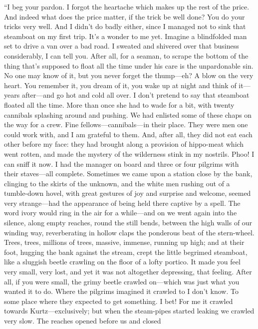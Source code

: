 \documentclass[12pt]{report}
\begin{document}
``I beg your pardon. I forgot the heartache which makes up the rest of
the price. And indeed what does the price matter, if the trick be well
done? You do your tricks very well. And I didn't do badly either, since
I managed not to sink that steamboat on my first trip. It's a wonder to
me yet. Imagine a blindfolded man set to drive a van over a bad road. I
sweated and shivered over that business considerably, I can tell you.
After all, for a seaman, to scrape the bottom of the thing that's
supposed to float all the time under his care is the unpardonable sin.
No one may know of it, but you never forget the thump---eh? A blow on
the very heart. You remember it, you dream of it, you wake up at night
and think of it---years after---and go hot and cold all over. I don't
pretend to say that steamboat floated all the time. More than once she
had to wade for a bit, with twenty cannibals splashing around and
pushing. We had enlisted some of these chaps on the way for a crew. Fine
fellows---cannibals---in their place. They were men one could work with,
and I am grateful to them. And, after all, they did not eat each other
before my face: they had brought along a provision of hippo-meat which
went rotten, and made the mystery of the wilderness stink in my
nostrils. Phoo! I can sniff it now. I had the manager on board and three
or four pilgrims with their staves---all complete. Sometimes we came
upon a station close by the bank, clinging to the skirts of the unknown,
and the white men rushing out of a tumble-down hovel, with great
gestures of joy and surprise and welcome, seemed very strange---had the
appearance of being held there captive by a spell. The word ivory would
ring in the air for a while---and on we went again into the silence,
along empty reaches, round the still bends, between the high walls of
our winding way, reverberating in hollow claps the ponderous beat of the
stern-wheel. Trees, trees, millions of trees, massive, immense, running
up high; and at their foot, hugging the bank against the stream, crept
the little begrimed steamboat, like a sluggish beetle crawling on the
floor of a lofty portico. It made you feel very small, very lost, and
yet it was not altogether depressing, that feeling. After all, if you
were small, the grimy beetle crawled on---which was just what you wanted
it to do. Where the pilgrims imagined it crawled to I don't know. To
some place where they expected to get something. I bet! For me it
crawled towards Kurtz---exclusively; but when the steam-pipes started
leaking we crawled very slow. The reaches opened before us and closed
\end{document}
